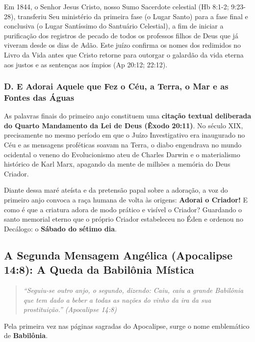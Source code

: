 \documentclass[11pt,a4paper,openany]{book}
\begin{document}
Em 1844, o Senhor Jesus Cristo, nosso Sumo Sacerdote celestial (Hb 8:1-2; 9:23-28), transferiu Seu ministério da primeira fase (o Lugar Santo) para a fase final e conclusiva (o Lugar Santíssimo do Santuário Celestial), a fim de iniciar a purificação dos registros de pecado de todos os professos filhos de Deus que já viveram desde os dias de Adão. Este juízo confirma os nomes dos redimidos no Livro da Vida antes que Cristo retorne para outorgar o galardão da vida eterna aos justos e as sentenças aos ímpios (Ap 20:12; 22:12).


\subsubsection*{D. E Adorai Aquele que Fez o Céu, a Terra, o Mar e as Fontes das Águas}

As palavras finais do primeiro anjo constituem uma \textbf{citação textual deliberada do Quarto Mandamento da Lei de Deus (Êxodo 20:11)}. No século XIX, precisamente no mesmo período em que o Juízo Investigativo era inaugurado no Céu e as mensagens proféticas soavam na Terra, o diabo engendrava no mundo ocidental o veneno do Evolucionismo ateu de Charles Darwin e o materialismo histórico de Karl Marx, apagando da mente de milhões a memória do Deus Criador.

Diante dessa maré ateísta e da pretensão papal sobre a adoração, a voz do primeiro anjo convoca a raça humana de volta às origens: \textbf{Adorai o Criador!} E como é que a criatura adora de modo prático e visível o Criador? Guardando o santo memorial eterno que o próprio Criador estabeleceu no Éden e ordenou no Decálogo: o \textbf{Sábado do sétimo dia}.



\subsection{A Segunda Mensagem Angélica (Apocalipse 14:8): A Queda da Babilônia Mística}



\begin{quote}
\itshape \textit{``Seguiu-se outro anjo, o segundo, dizendo: Caiu, caiu a grande Babilônia que tem dado a beber a todas as nações do vinho da ira da sua prostituição.''} (Apocalipse 14:8)
\end{quote}


Pela primeira vez nas páginas sagradas do Apocalipse, surge o nome emblemático de \textbf{Babilônia}.
\end{document}
